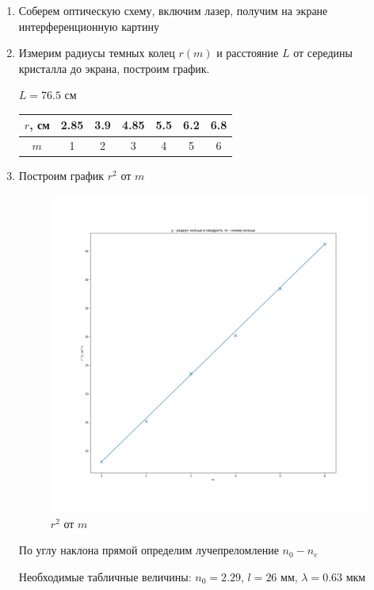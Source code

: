 \documentclass[a4paper, 12pt]{article}
\begin{document}
\begin{enumerate}
    \item Соберем оптическую схему, включим лазер, получим на экране интерференционную картину
    \item Измерим радиусы темных колец $r(m)$ и расстояние $L$ от середины кристалла до экрана, построим график.

    $L = 76.5$ см

    \begin{tabular}{|c|c|c|c|c|c|c|} \hline
        $r$, см & 2.85 & 3.9 & 4.85 & 5.5 & 6.2 & 6.8 \\ \hline
        $m$ & 1 & 2 & 3 & 4 & 5 & 6 \\ \hline   
    \end{tabular}

    \item Построим график $r^2$ от $m$
    
    \begin{figure}
        \includegraphics[scale=0.45]{graph1.png}
        \centering
        \caption{$r^2$ от $m$}
        \label{graph1}
    \end{figure}

    По углу наклона прямой определим лучепреломление $n_0 - n_e$ ~

    Необходимые табличные величины: $n_0 = 2.29$, $l = 26$ мм, $\lambda = 0.63$ мкм


\end{enumerate}
\end{document}
